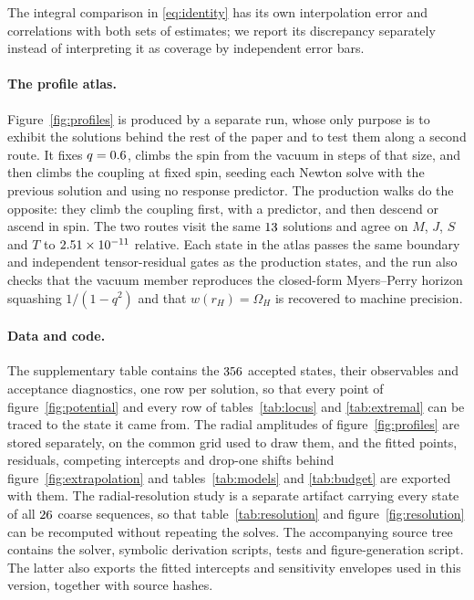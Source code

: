 \documentclass[11pt,a4paper]{article}
\begin{document}
The integral comparison in \eqref{eq:identity} has its own
interpolation error and correlations with both sets of estimates;
we report its discrepancy separately instead of interpreting it as
coverage by independent error bars.

\paragraph{The profile atlas.}
Figure~\ref{fig:profiles} is produced by a separate run, whose only purpose is
to exhibit the solutions behind the rest of the paper and to test them along a
second route. It fixes $q=0.6$, climbs the spin from the vacuum in
steps of that size, and then climbs the coupling at fixed spin, seeding each
Newton solve with the previous solution and using no response predictor. The
production walks do the opposite: they climb the coupling first, with a
predictor, and then descend or ascend in spin. The two routes visit the same
$13$ solutions and agree on $M$, $J$, $S$ and $T$ to
$2.51\times 10^{-11}$ relative. Each state in the atlas passes the same
boundary and independent tensor-residual gates as the production states, and
the run also checks that the vacuum member reproduces the closed-form
Myers--Perry horizon squashing $1/(1-q^2)$ and that $w(r_H)=\Omega_H$ is
recovered to machine precision.

\paragraph{Data and code.}
The supplementary table contains the $356$ accepted states,
their observables and acceptance diagnostics, one row per solution, so that
every point of figure~\ref{fig:potential} and every row of
tables~\ref{tab:locus} and \ref{tab:extremal} can be traced to the state it
came from. The radial amplitudes of figure~\ref{fig:profiles} are stored
separately, on the common grid used to draw them, and the fitted points,
residuals, competing intercepts and drop-one shifts behind
figure~\ref{fig:extrapolation} and tables~\ref{tab:models} and
\ref{tab:budget} are exported with them. The radial-resolution study is a
separate artifact carrying every state of all $26$ coarse sequences,
so that table~\ref{tab:resolution} and figure~\ref{fig:resolution} can be
recomputed without repeating the solves.
The accompanying source tree contains the solver, symbolic
derivation scripts, tests and figure-generation script.
The latter also exports the fitted intercepts and sensitivity
envelopes used in this version, together with source hashes.
\end{document}
